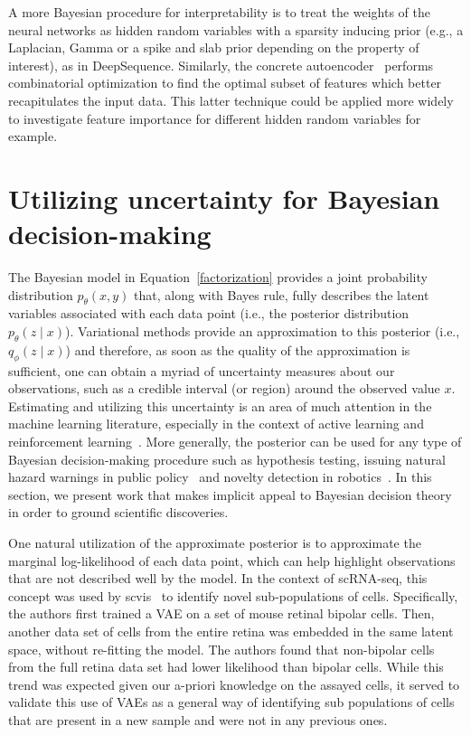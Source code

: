 A more Bayesian procedure for interpretability is to treat the weights of the neural networks as hidden random variables with a sparsity inducing prior (e.g., a Laplacian, Gamma or a spike and slab prior depending on the property of interest), as in DeepSequence. Similarly, the concrete autoencoder~\cite{balin2019concrete} performs combinatorial optimization to find the optimal subset of features which better recapitulates the input data. This latter technique could be applied more widely to investigate feature importance for different hidden random variables for example. 

\section{Utilizing uncertainty for Bayesian decision-making}
The Bayesian model in Equation~\eqref{factorization} provides a joint probability distribution $p_\theta(x, y)$ that, along with Bayes rule, fully describes the latent variables associated with each data point (i.e., the posterior distribution $p_\theta(z\mid x)$). Variational methods provide an approximation to this posterior  (i.e., $q_\phi(z\mid x)$) and therefore, as soon as the quality of the approximation is sufficient, one can obtain a myriad of uncertainty measures about our observations, such as a credible interval (or region) around the observed value $x$. Estimating and utilizing this uncertainty is an area of much attention in the machine learning literature, especially in the context of active learning and reinforcement learning~\cite{Osband2018RandomizedLearning}. More generally, the posterior can be used for any type of Bayesian decision-making procedure such as hypothesis testing, issuing natural hazard warnings in public policy~\cite{economou2016use} and novelty detection in robotics~\cite{amini2018variational}. In this section, we present work that makes implicit appeal to Bayesian decision theory~\cite{berger2013statistical} in order to ground scientific discoveries. 

One natural utilization of the approximate posterior is to approximate the marginal log-likelihood of each data point, which can help highlight observations that are not described well by the model. In the context of scRNA-seq, this concept was used by scvis~\cite{Ding2018} to identify novel sub-populations of cells. Specifically, the authors first trained a VAE on a set of mouse retinal bipolar cells. Then, another data set of cells from the entire retina was embedded in the same latent space, without re-fitting the model. The authors found that non-bipolar cells from the full retina data set had lower likelihood than bipolar cells. While this trend was expected given our a-priori knowledge on the assayed cells, it served to validate this use of VAEs as a general way of identifying sub populations of cells that are present in a new sample and were not in any previous ones. %


